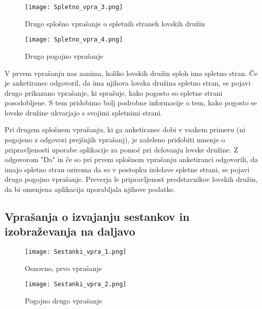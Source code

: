 \documentclass[a4paper,12pt,openright]{book}
\begin{document}
\begin{figure}[h!]  
  \centering
  \begin{minipage}[b]{\textwidth}  
    \centering
    \texttt{[image: Spletno\_vpra\_3.png]}
    \caption{Drugo splošno vprašanje o spletnih straneh lovskih družin}
    \label{fig:spletno_vpra_3}
  \end{minipage}
  
  \vspace{0.5cm} %
  
  \begin{minipage}[b]{\textwidth} 
    \centering
    \texttt{[image: Spletno\_vpra\_4.png]}
    \caption{Drugo pogojno vprašanje}
    \label{fig:spletno_vpra_4}
  \end{minipage}
  
\end{figure}

V prvem vprašanju nas zanima, koliko lovskih družin sploh ima spletno stran.
Če je anketiranec odgovoril, da ima njihova lovska družina spletno stran, se pojavi drugo prikazano vprašanje, ki sprašuje, kako pogosto so spletne strani posodobljene. 
S tem pridobimo bolj podrobne informacije o tem, kako pogosto se lovske družine ukvarjajo s svojimi spletnimi strani.



Pri drugem splošnem vprašanju, ki ga anketiranec dobi v vsakem primeru (ni pogojeno z odgovori prejšnjih vprašanj), je zaželeno pridobiti mnenje o pripravljenosti uporabe aplikacije za pomoč pri delovanju lovske družine.
Z odgovorom "Da" in če so pri prvem splošnem vprašanju anketiranci odgovorili, da imajo spletno stran oziroma da so v postopku izdelave spletne strani, se pojavi drugo pogojno vprašanje.
Preverja le pripravljenost predstavnikov lovskih družin, da bi omenjena aplikacija uporabljala njihove podatke.

\subsection{Vprašanja o izvajanju sestankov in izobraževanja na daljavo}

\begin{figure}[h!]
  \centering
  \begin{minipage}[b]{\textwidth}
    \centering
    \texttt{[image: Sestanki\_vpra\_1.png]}
    \caption{Osnovno, prvo vprašanje}
    \label{fig:sestanki_vpra_1}
  \end{minipage}
  
  \vspace{0.5cm} %
  
  \begin{minipage}[b]{0.6\textwidth}
    \centering
    \texttt{[image: Sestanki\_vpra\_2.png]}
    \caption{Pogojno drugo vprašanje}
    \label{fig:sestanki_vpra_2}
  \end{minipage}
\end{figure}
\end{document}
